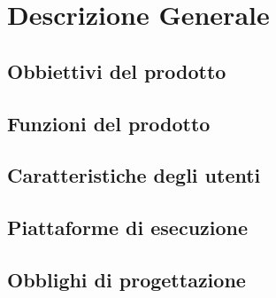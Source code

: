\section{Descrizione Generale}
\subsection{Obbiettivi del prodotto}

\subsection{Funzioni del prodotto}

\subsection{Caratteristiche degli utenti}

\subsection{Piattaforme di esecuzione}

\subsection{Obblighi di progettazione}